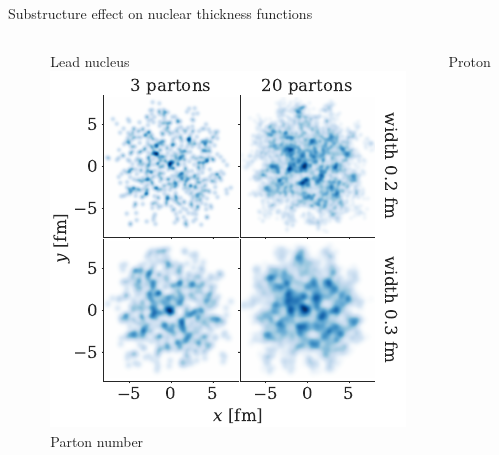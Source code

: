 \documentclass{beamer}
\begin{document}
\begin{frame}{Substructure effect on nuclear thickness functions}
  \smallskip
  \begin{columns}
    \begin{column}{.02\textwidth}
    \end{column}
    \begin{column}{.49\textwidth}
      \centering Lead nucleus \\ 
      \includegraphics[height=\columnwidth]{Pb_thickness} \\
      \small Parton number
    \end{column}
    \begin{column}{.49\textwidth}
      \centering Proton \\

\end{column}
\end{columns}
\end{frame}
\end{document}

